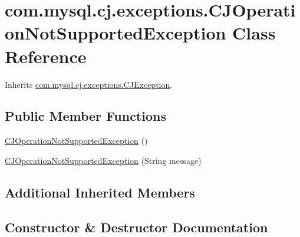 \hypertarget{classcom_1_1mysql_1_1cj_1_1exceptions_1_1_c_j_operation_not_supported_exception}{}\section{com.\+mysql.\+cj.\+exceptions.\+C\+J\+Operation\+Not\+Supported\+Exception Class Reference}
\label{classcom_1_1mysql_1_1cj_1_1exceptions_1_1_c_j_operation_not_supported_exception}


Inherits \mbox{\hyperlink{classcom_1_1mysql_1_1cj_1_1exceptions_1_1_c_j_exception}{com.\+mysql.\+cj.\+exceptions.\+C\+J\+Exception}}.

\subsection*{Public Member Functions}
\begin{DoxyCompactItemize}
\item 
\mbox{\hyperlink{classcom_1_1mysql_1_1cj_1_1exceptions_1_1_c_j_operation_not_supported_exception_ab06a3b64b4fe65960e475ff75757728d}{C\+J\+Operation\+Not\+Supported\+Exception}} ()
\item 
\mbox{\hyperlink{classcom_1_1mysql_1_1cj_1_1exceptions_1_1_c_j_operation_not_supported_exception_a14e5456561ad21542cfce871cbe41307}{C\+J\+Operation\+Not\+Supported\+Exception}} (String message)
\end{DoxyCompactItemize}
\subsection*{Additional Inherited Members}


\subsection{Constructor \& Destructor Documentation}
\mbox{\label{classcom_1_1mysql_1_1cj_1_1exceptions_1_1_c_j_operation_not_supported_exception_ab06a3b64b4fe65960e475ff75757728d}} 
